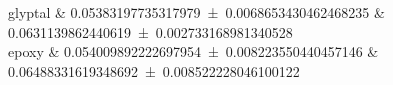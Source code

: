 glyptal 		&		\num{0.05383197735317979 \pm 0.0068653430462468235} 		&		\num{0.0631139862440619 \pm 0.002733168981340528}	 \\ 
epoxy 		&		\num{0.054009892222697954 \pm 0.008223550440457146} 		&		\num{0.06488331619348692 \pm 0.008522228046100122}	 \\ 
